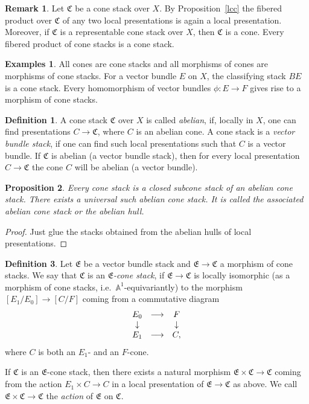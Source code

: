 \documentclass[11pt]{article}
\theoremstyle{plain}
\newtheorem{prop}{Proposition}[section]
\theoremstyle{definition}
\newtheorem{defnp}[prop]{Definition}
\newenvironment{defn}{\begin{defnp}\normalfont}{\end{defnp}}
\newtheorem{examplesp}{Examples}\renewcommand{\theexamplesp}{}
\newtheorem{rmkp}{Remark}\renewcommand{\thermkp}{}
\newenvironment{examples}{\begin{examplesp}\normalfont}{\end{examplesp}}
\newenvironment{rmk}{\begin{rmkp}\normalfont}{\end{rmkp}}
\newenvironment{pf}{\begin{proof}}{\end{proof}}
\newcommand{\EE}{{\mathfrak{E}}}
\newcommand{\CC}{{\mathfrak{C}}}
\newcommand{\aaa}{{\mathbb{A}}}
\newcommand{\ldiag}[1]
       {\makebox[0cm]{\({\scriptstyle#1}\downarrow\phantom{\scriptstyle#1}\)}}
\newcommand{\rdiag}[1]
       {\makebox[0cm]{\(\phantom{\scriptstyle#1}\downarrow{\scriptstyle#1}\)}}
\newcommand{\comdia}[9]{
\begin{array}{ccc}
#1 & \stackrel{#2}{\longrightarrow} & #3 \\
\ldiag{#4} & #5 & \rdiag{#6} \\
#7 & \stackrel{#8}{\longrightarrow} & #9
\end{array}}
\theoremstyle{plain}
\theoremstyle{definition}
\theoremstyle{remark}
\begin{document}
\begin{rmk}
Let \(\CC\) be a cone stack over \(X\). By Proposition~\ref{lcc} the
fibered product over \(\CC\) of any two local presentations is again a
local presentation. Moreover, if \(\CC\) is a representable cone stack
over \(X\), then \(\CC\) is a cone. Every fibered product of cone stacks
is a cone stack.
\end{rmk}

\begin{examples}
All cones are cone stacks and all morphisms of cones are morphisms of
cone stacks. For a vector bundle \(E\) on \(X\), the classifying stack
\(BE\) is a cone stack. Every homomorphism of vector bundles
\(\phi:E\rightarrow F\) gives rise to a morphism of cone stacks.
\end{examples}

\begin{defn}
A cone stack \(\CC\) over \(X\) is called {\em abelian}, if, locally in
\(X\), one can find presentations \(C\rightarrow\CC\), where \(C\) is an
abelian cone. A cone stack is a {\em vector bundle stack}, if one can
find such local presentations such that \(C\) is a vector bundle. If
\(\CC\) is abelian (a vector bundle stack), then for every local
presentation \(C\rightarrow\CC\) the cone \(C\) will be abelian (a vector
bundle).
\end{defn}

\begin{prop}
Every cone stack is a closed subcone stack of an abelian cone
stack. There exists a universal such abelian cone stack. It is called
the {\em associated abelian cone stack }or the {\em abelian hull}.
\end{prop}
\begin{pf}
Just glue the stacks obtained from the abelian hulls of local
presentations.
\end{pf}

\begin{defn} \label{dics}
Let \(\EE\) be a vector bundle stack and \(\EE\to\CC\) a morphism of cone
stacks. We say that \(\CC\) is an {\em \(\EE\)-cone stack}, if \(\EE\to\CC\)
is locally isomorphic (as a morphism of cone stacks, i.e.\
\(\aaa^1\)-equivariantly) to the morphism \([E_1/E_0]\to[C/F]\) coming from
a commutative diagram
\[
\comdia{E_0}{}{F}{}{}{}{E_1}{}{C,}
\]
where \(C\) is both an \(E_1\)- and an \(F\)-cone.
\end{defn}

If \(\CC\) is an \(\EE\)-cone stack, then there exists a natural morphism
\(\EE\times\CC\to\CC\) coming from the action \(E_1\times C\to C\) in a
local presentation of \(\EE\to\CC\) as above.  We call
\(\EE\times\CC\to\CC\) the {\em action } of \(\EE\) on \(\CC\).
\end{document}
